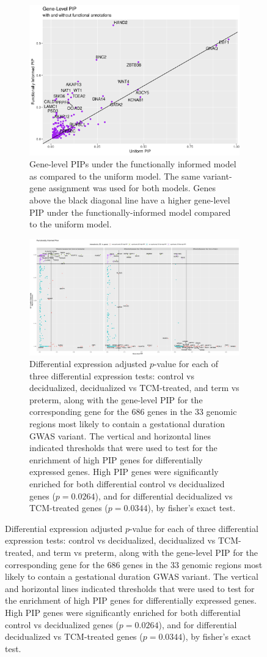 \begin{figure}
  \centering
  \begin{subfigure}[t]{\textwidth}
    \centering
    \includegraphics[width=\linewidth]{img/null-gene-gene-comp.png}
    \caption{Gene-level PIPs under the functionally informed model as compared to the uniform model.  The same variant-gene assignment was used for both models.  Genes above the black diagonal line have a higher gene-level PIP under the functionally-informed model compared to the uniform model.  }\label{fig:univ_assoc}
  \end{subfigure}
    \begin{subfigure}[t]{\textwidth}
    \centering
    \includegraphics[width=\linewidth]{img/de-gwas-comp.png}
    \caption{Differential expression adjusted $p$-value for each of three differential expression tests: control vs decidualized, decidualized vs TCM-treated, and term vs preterm, along with the gene-level PIP for the corresponding gene for the 686 genes in the 33 genomic regions most likely to contain a gestational duration GWAS variant.  The vertical and horizontal lines indicated thresholds that were used to test for the enrichment of high PIP genes for differentially expressed genes. High PIP genes were significantly enriched for both differential control vs decidualized genes ($p=0.0264$), and for differential decidualized vs TCM-treated genes ($p=0.0344$), by fisher's exact test.}\label{fig:multiv_assoc}
    \end{subfigure}
\end{figure}




